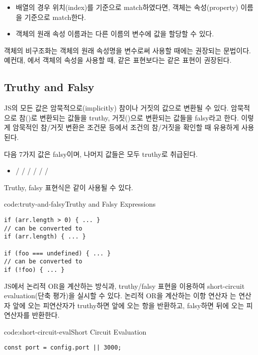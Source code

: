 \begin{itemize}
    \item 배열의 경우 위치(index)를 기준으로 match하였다면, 객체는 속성(property) 이름을 기준으로 match한다.
    \item 객체의 원래 속성 이름과는 다른 이름의 변수에 값을 할당할 수 있다.
\end{itemize}

객체의 비구조화는 객체의 원래 속성명을 변수로써 사용할 때에는 권장되는 문법이다. 예컨대, 에서  객체의  속성을 사용할 때,  같은 표현보다는  같은 표현이 권장된다.

\subsection*{Truthy and Falsy}

JS의 모든 값은 암묵적으로(implicitly) 참이나 거짓의 값으로 변환될 수 있다. 암묵적으로 참()로 변환되는 값들을 truthy, 거짓()으로 변환되는 값들을 falsy라고 한다. 이렇게 암묵적인 참/거짓 변환은 조건문 등에서 조건의 참/거짓을 확인할 때 유용하게 사용된다.

다음 7가지 값은 falsy이며, 나머지 값들은 모두 truthy로 취급된다.

\begin{itemize}
    \item {} /  /  /  /  /  / 
\end{itemize}

Truthy, falsy 표현식은 \와 같이 사용될 수 있다.

\begin{codeenv}{code:truty-and-falsy}{Truthy and Falsy Expressions}\begin{verbatim}
if (arr.length > 0) { ... }
// can be converted to
if (arr.length) { ... }

if (foo === undefined) { ... }
// can be converted to
if (!foo) { ... }
\end{verbatim}
\end{codeenv}

JS에서 논리적 OR을 계산하는 방식과, truthy/falsy 표현을 이용하여 short-circuit evaluation(단축 평가)을 실시할 수 있다. 논리적 OR을 계산하는 이항 연산자 \cd{||}는 연산자 앞에 오는 피연산자가 truthy하면 앞에 오는 항을 반환하고, falsy하면 뒤에 오는 피연산자를 반환한다.

\begin{codeenv}{code:short-circuit-eval}{Short Circuit Evaluation}\begin{verbatim}
const port = config.port || 3000;
\end{verbatim}
\end{codeenv}

